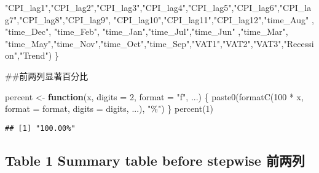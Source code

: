 \documentclass[
]{article}
\newenvironment{Shaded}{\begin{snugshade}}{\end{snugshade}}
\newcommand{\AttributeTok}[1]{\textcolor[rgb]{0.77,0.63,0.00}{#1}}
\newcommand{\ControlFlowTok}[1]{\textcolor[rgb]{0.13,0.29,0.53}{\textbf{#1}}}
\newcommand{\DecValTok}[1]{\textcolor[rgb]{0.00,0.00,0.81}{#1}}
\newcommand{\FunctionTok}[1]{\textcolor[rgb]{0.00,0.00,0.00}{#1}}
\newcommand{\NormalTok}[1]{#1}
\newcommand{\OtherTok}[1]{\textcolor[rgb]{0.56,0.35,0.01}{#1}}
\newcommand{\SpecialCharTok}[1]{\textcolor[rgb]{0.00,0.00,0.00}{#1}}
\newcommand{\StringTok}[1]{\textcolor[rgb]{0.31,0.60,0.02}{#1}}
\begin{document}
\begin{Shaded}
\begin{Highlighting}[]
                                         \StringTok{"CPI\_lag1"}\NormalTok{,}\StringTok{"CPI\_lag2"}\NormalTok{,}\StringTok{"CPI\_lag3"}\NormalTok{,}\StringTok{"CPI\_lag4"}\NormalTok{,}\StringTok{"CPI\_lag5"}\NormalTok{,}\StringTok{"CPI\_lag6"}\NormalTok{,}\StringTok{"CPI\_lag7"}\NormalTok{,}\StringTok{"CPI\_lag8"}\NormalTok{,}\StringTok{"CPI\_lag9"}\NormalTok{,}
                                         \StringTok{"CPI\_lag10"}\NormalTok{,}\StringTok{"CPI\_lag11"}\NormalTok{,}\StringTok{"CPI\_lag12"}\NormalTok{,}\StringTok{"time\_Aug"}\NormalTok{ , }
                                         \StringTok{"time\_Dec"}\NormalTok{, }\StringTok{"time\_Feb"}\NormalTok{, }\StringTok{"time\_Jan"}\NormalTok{,}\StringTok{"time\_Jul"}\NormalTok{,}\StringTok{"time\_Jun"}\NormalTok{ ,}\StringTok{"time\_Mar"}\NormalTok{,}
                                         \StringTok{"time\_May"}\NormalTok{,}\StringTok{"time\_Nov"}\NormalTok{,}\StringTok{"time\_Oct"}\NormalTok{,}\StringTok{"time\_Sep"}\NormalTok{,}\StringTok{"VAT1"}\NormalTok{,}\StringTok{"VAT2"}\NormalTok{,}\StringTok{"VAT3"}\NormalTok{,}\StringTok{"Recession"}\NormalTok{,}\StringTok{"Trend"}\NormalTok{)}
\NormalTok{\}}
\end{Highlighting}
\end{Shaded}

\#\#前两列显著百分比

\begin{Shaded}
\begin{Highlighting}[]
\NormalTok{percent }\OtherTok{\textless{}{-}} \ControlFlowTok{function}\NormalTok{(x, }\AttributeTok{digits =} \DecValTok{2}\NormalTok{, }\AttributeTok{format =} \StringTok{"f"}\NormalTok{, ...) \{}
  \FunctionTok{paste0}\NormalTok{(}\FunctionTok{formatC}\NormalTok{(}\DecValTok{100} \SpecialCharTok{*}\NormalTok{ x, }\AttributeTok{format =}\NormalTok{ format, }\AttributeTok{digits =}\NormalTok{ digits, ...), }\StringTok{"\%"}\NormalTok{)}
\NormalTok{\}}
\FunctionTok{percent}\NormalTok{(}\DecValTok{1}\NormalTok{)}
\end{Highlighting}
\end{Shaded}

\begin{verbatim}
## [1] "100.00%"
\end{verbatim}

\hypertarget{table-1-summary-table-before-stepwise-ux524dux4e24ux5217}{%
\subsection{Table 1 Summary table before stepwise
前两列}\label{table-1-summary-table-before-stepwise-ux524dux4e24ux5217}}
\end{document}
